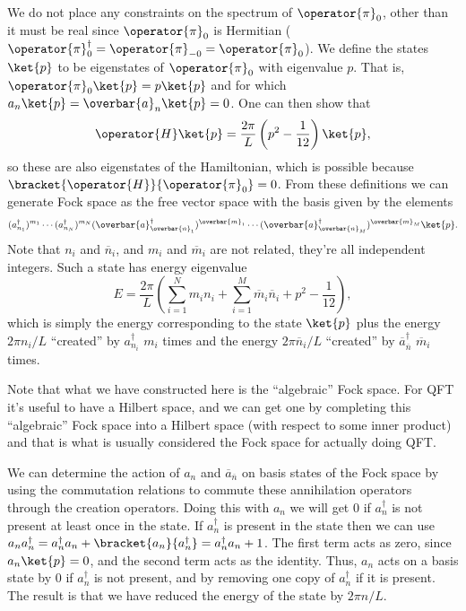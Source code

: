 \documentclass[fleqn]{NotesClass}
\newcommand{\hermit}{{\dagger}}
\begin{document}
    We do not place any constraints on the spectrum of \(\operator{\pi}_0\), other than it must be real since \(\operator{\pi}_0\) is Hermitian (\(\operator{\pi}_0^{\hermit} = \operator{\pi}_{-0} = \operator{\pi}_{0}\)).
    We define the states \(\ket{p}\) to be eigenstates of \(\operator{\pi}_0\) with eigenvalue \(p\).
    That is, \(\operator{\pi}_0\ket{p} = p\ket{p}\) and for which \(a_n\ket{p} = \overbar{a}_n\ket{p} = 0\).
    One can then show that
    \begin{equation}
        \operator{H}\ket{p} = \frac{2\pi}{L}\left( p^2 - \frac{1}{12} \right)\ket{p},
    \end{equation}
    so these are also eigenstates of the Hamiltonian, which is possible because \(\bracket{\operator{H}}{\operator{\pi}_0} = 0\).
    From these definitions we can generate Fock space as the free vector space with the basis given by the elements
    \begin{equation}
        (a_{n_1}^{\hermit})^{m_1} \dotsm (a_{n_N}^{\hermit})^{m_N} (\overbar{a}_{\overbar{n}_1}^{\hermit})^{\overbar{m}_1} \dotsm (\overbar{a}_{\overbar{n}_M}^{\hermit})^{\overbar{m}_M} \ket{p}.
    \end{equation}
    Note that \(n_i\) and \(\overbar{n}_i\), and \(m_i\) and \(\overbar{m}_i\) are not related, they're all independent integers.
    Such a state has energy eigenvalue
    \begin{equation}
        E = \frac{2\pi}{L}\left( \sum_{i=1}^N m_in_i + \sum_{i=1}^M \overbar{m}_i \overbar{n}_i + p^2 - \frac{1}{12} \right),
    \end{equation}
    which is simply the energy corresponding to the state \(\ket{p}\) plus the energy \(2\pi n_i/L\) \enquote{created} by \(a_{n_i}^{\hermit}\) \(m_i\) times and the energy \(2\pi \overbar{n}_i/L\) \enquote{created} by \(\overbar{a}_{\overbar{n}}^{\hermit}\) \(\overbar{m}_i\) times.
    
    Note that what we have constructed here is the \enquote{algebraic} Fock space.
    For QFT it's useful to have a Hilbert space, and we can get one by completing this \enquote{algebraic} Fock space into a Hilbert space (with respect to some inner product) and that is what is usually considered the Fock space for actually doing QFT.
    
    We can determine the action of \(a_n\) and \(\overbar{a}_{\overbar{n}}\) on basis states of the Fock space by using the commutation relations to commute these annihilation operators through the creation operators.
    Doing this with \(a_n\) we will get \(0\) if \(a_n^{\hermit}\) is not present at least once in the state.
    If \(a_n^{\hermit}\) is present in the state then we can use \(a_na_n^{\hermit} = a_n^{\hermit}a_n + \bracket{a_n}{a_n^{\hermit}} = a_n^{\hermit}a_n + 1\).
    The first term acts as zero, since \(a_n\ket{p} = 0\), and the second term acts as the identity.
    Thus, \(a_n\) acts on a basis state by 0 if \(a_n^{\hermit}\) is not present, and by removing one copy of \(a_n^{\hermit}\) if it is present.
    The result is that we have reduced the energy of the state by \(2\pi n/L\).
    
\end{document}
